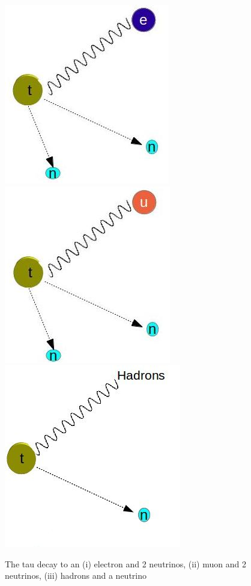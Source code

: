 \documentclass[final,3p,times,twocolumn]{elsarticle}
\begin{document}
\begin{figure}
\includegraphics[scale=0.5]{Images/Te.jpg}
\includegraphics[scale=0.5]{Images/Tm.jpg}
\includegraphics[scale=0.4]{Images/Th.jpg}
\caption{The tau decay to an (i) electron and 2 neutrinos, (ii) muon and 2 neutrinos, (iii) hadrons and a neutrino}
\label{Tau_decay}
\end{figure}
\end{document}
